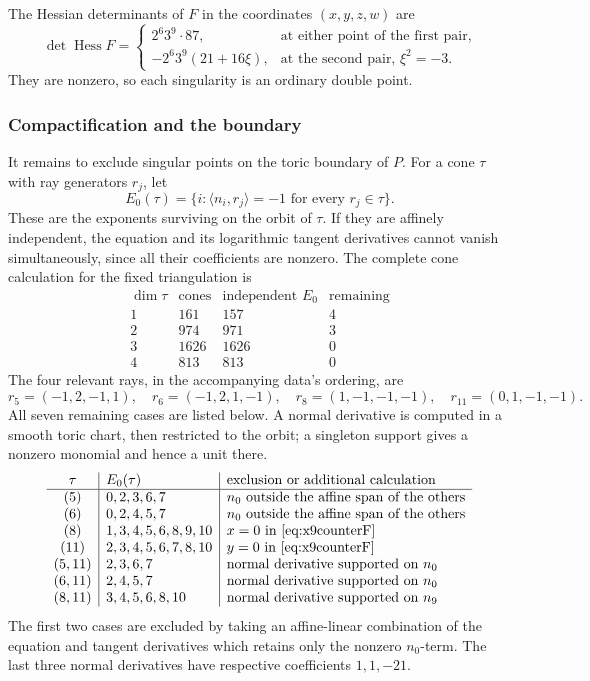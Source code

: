 The Hessian determinants of $F$ in the coordinates $(x,y,z,w)$ are
\begin{equation}\label{eq:x9hessians}
 \det\operatorname{Hess}F=
 \begin{cases}
  2^6 3^9\cdot87,&\text{at either point of the first pair},\\
  -2^6 3^9(21+16\xi),&\text{at the second pair, }\xi^2=-3.
 \end{cases}
\end{equation}
They are nonzero, so each singularity is an ordinary double point.

\subsubsection*{Compactification and the boundary}

It remains to exclude singular points on the toric boundary of $P$.
For a cone $\tau$ with ray generators $r_j$, let
\[
 E_0(\tau)=\{i:\langle n_i,r_j\rangle=-1\text{ for every }r_j\in\tau\}.
\]
These are the exponents surviving on the orbit of $\tau$.
If they are affinely independent, the equation and its logarithmic
tangent derivatives cannot vanish simultaneously, since all their
coefficients are nonzero. The complete cone calculation for the fixed
triangulation is
\[
\begin{array}{c|r|r|r}
\dim\tau&\text{cones}&\text{independent }E_0&\text{remaining}\\\hline
1&161&157&4\\
2&974&971&3\\
3&1626&1626&0\\
4&813&813&0
\end{array}
\]
The four relevant rays, in the accompanying data's ordering, are
\[
 r_5=(-1,2,-1,1),\quad r_6=(-1,2,1,-1),\quad
 r_8=(1,-1,-1,-1),\quad r_{11}=(0,1,-1,-1).
\]
All seven remaining cases are listed below. A normal derivative is
computed in a smooth toric chart, then restricted to the orbit; a
singleton support gives a nonzero monomial and hence a unit there.
\begin{equation}\label{eq:x9boundarytable}
\begin{array}{c|l|l}
\tau&E_0(\tau)&\text{exclusion or additional calculation}\\\hline
(5)&0,2,3,6,7&n_0\text{ outside the affine span of the others}\\
(6)&0,2,4,5,7&n_0\text{ outside the affine span of the others}\\
(8)&1,3,4,5,6,8,9,10&x=0\text{ in \eqref{eq:x9counterF}}\\
(11)&2,3,4,5,6,7,8,10&y=0\text{ in \eqref{eq:x9counterF}}\\
(5,11)&2,3,6,7&\text{normal derivative supported on }n_0\\
(6,11)&2,4,5,7&\text{normal derivative supported on }n_0\\
(8,11)&3,4,5,6,8,10&\text{normal derivative supported on }n_9
\end{array}
\end{equation}
The first two cases are excluded by taking an affine-linear combination
of the equation and tangent derivatives which retains only the
nonzero $n_0$-term. The last three normal derivatives have respective
coefficients $1,1,-21$.

